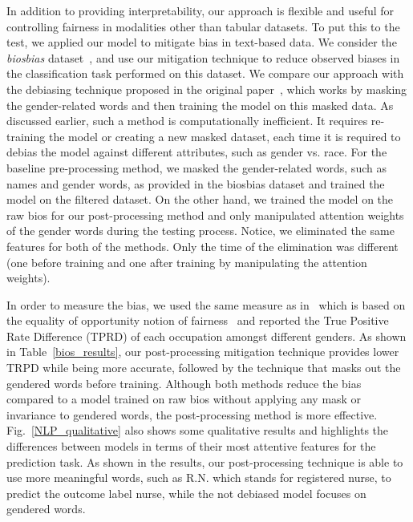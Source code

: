 In addition to providing interpretability, our approach is flexible and useful for controlling fairness in modalities other than tabular datasets. To put this to the test, we applied our model to mitigate bias in text-based data. We consider the \textit{biosbias} dataset~\cite{de2019bias}, and  use our mitigation technique to reduce observed biases in the classification task performed on this dataset. We compare our approach with the debiasing technique proposed in the original paper~\cite{de2019bias}, which works  by masking the gender-related words and then training the model on this masked data. As discussed earlier, such a method is computationally inefficient. It requires  re-training the model or creating a new masked dataset, each time it is  required to debias the model against different attributes, such as gender vs. race. 
For the baseline pre-processing method, we masked the gender-related words, such as names and gender words, as provided in the biosbias dataset and trained the model on the filtered dataset. On the other hand, we trained the model on the raw bios for our post-processing method and only manipulated attention weights of the gender words during the testing process. Notice, we eliminated the same features for both of the methods. Only the time of the elimination was different (one before training and one after training by manipulating the attention weights).


In order to measure the bias, we used the same measure as in~\cite{de2019bias} which is based on the equality of opportunity notion of fairness~\cite{NIPS2016_9d268236} and reported the True Positive Rate Difference (TPRD) of each occupation amongst different genders. As shown in Table~\ref{bios_results}, our post-processing mitigation technique provides lower TRPD while being more accurate, followed by the technique that masks out the gendered words before training. Although both methods reduce the bias compared to a model trained on raw bios without applying any mask or invariance to gendered words, the post-processing method is more effective. 
Fig.~\ref{NLP_qualitative} also shows some qualitative results and highlights the differences between models in terms of their most attentive features for the prediction task. As shown in the results, our post-processing technique is able to use more meaningful words, such as R.N. which stands for registered nurse, to predict the outcome label nurse, while the not debiased model focuses on gendered words.






